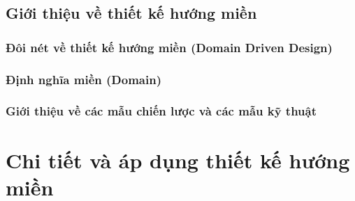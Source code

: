 \documentclass{report} %
\begin{document}
% 















% 


\section{Giới thiệu về thiết kế hướng miền}



\subsection{Đôi nét về thiết kế hướng miền (Domain Driven Design)}





\subsection{Định nghĩa miền (Domain)}



\subsection{Giới thiệu về các mẫu chiến lược và các mẫu kỹ thuật}



\chapter{Chi tiết và áp dụng thiết kế hướng miền}


% 

\end{document}
